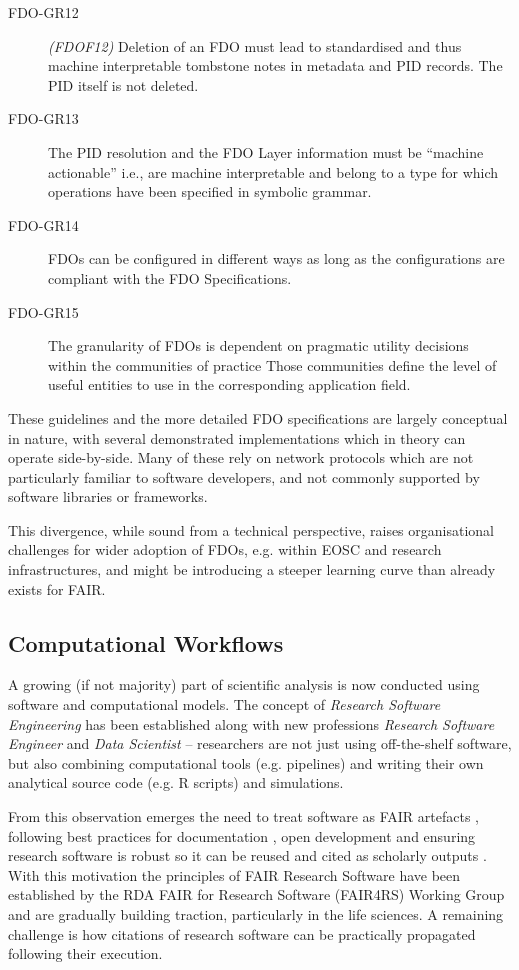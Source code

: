 \begin{description}
\item[FDO-GR12] \emph{(FDOF12)} Deletion of an FDO must lead to standardised and thus machine interpretable tombstone notes in metadata and PID records.  The PID itself is not deleted.
\item[FDO-GR13] The PID resolution and the FDO Layer information must be “machine actionable” i.e., are machine interpretable and belong to a type for which operations have been specified in symbolic grammar. 
\item[FDO-GR14] FDOs can be configured in different ways as long as the configurations are compliant with the FDO Specifications. 
\item[FDO-GR15] The granularity of FDOs is dependent on pragmatic utility decisions within the communities of practice Those communities define the level of useful entities to use in the corresponding application field.
\end{description}

These guidelines and the more detailed FDO specifications \cite{Ivonne 2023} are largely conceptual in nature, with several demonstrated implementations \cite{Wittenburg 2022a,Lannom 2022a} which in theory can operate side-by-side. Many of these rely on network protocols \cite{Reilly 2009,Sun 2003a} which are not particularly familiar to software developers, and not commonly supported by software libraries or frameworks.

This divergence, while sound from a technical perspective, raises organisational challenges for wider adoption of FDOs, e.g. within EOSC and research infrastructures, and might be introducing a steeper learning curve than already exists for FAIR.


\subsection{Computational Workflows}

A growing (if not majority) part of scientific analysis is now conducted using software and computational models. The concept of \emph{Research Software Engineering} \cite{Cohen 2020} has been established along with new professions \emph{Research Software Engineer} \cite{Baxter 2012} and \emph{Data Scientist} \cite{van der Aalst 2014} -- researchers are not just using off-the-shelf software, but also combining computational tools (e.g. pipelines) and writing their own analytical source code (e.g. R scripts) and simulations.

From this observation emerges the need to treat software as FAIR artefacts \cite{Lamprecht 2019}, following best practices for documentation \cite{Lee 2018}, open development \cite{Prlić 2012} and ensuring research software is robust \cite{Taschuk 2017} so it can be reused and cited as scholarly outputs \cite{Smith 2016}. 
With this motivation the principles of FAIR Research Software \cite{Katz 2021b} have been established by the RDA FAIR for Research Software (FAIR4RS) Working Group \cite{Barker 2022} and are gradually building traction, particularly in the life sciences. A remaining challenge is how citations of research software can be practically propagated following their execution. 

